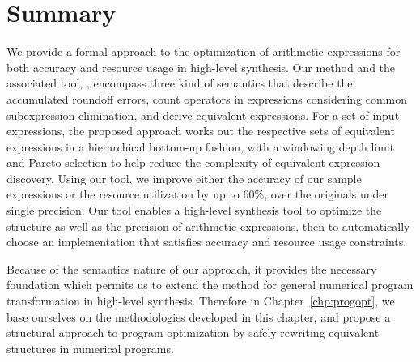 \section{Summary}
\label{so:sec:conclusion}

We provide a formal approach to the optimization of arithmetic expressions
for both accuracy and resource usage in high-level synthesis. Our method and
the associated tool, \soap, encompass three kind of semantics that describe
the accumulated roundoff errors, count operators in expressions considering
common subexpression elimination, and derive equivalent expressions. For a
set of input expressions, the proposed approach works out the respective
sets of equivalent expressions in a hierarchical bottom-up fashion, with a
windowing depth limit and Pareto selection to help reduce the complexity of
equivalent expression discovery. Using our tool, we improve either the accuracy
of our sample expressions or the resource utilization by up to 60\%, over the
originals under single precision. Our tool enables a high-level synthesis tool
to optimize the structure as well as the precision of arithmetic expressions,
then to automatically choose an implementation that satisfies accuracy and
resource usage constraints.

Because of the semantics nature of our approach, it provides the necessary
foundation which permits us to extend the method for general numerical program
transformation in high-level synthesis. Therefore in Chapter~\ref{chp:progopt},
we base ourselves on the methodologies developed in this chapter, and propose
a structural approach to program optimization by safely rewriting equivalent
structures in numerical programs.
